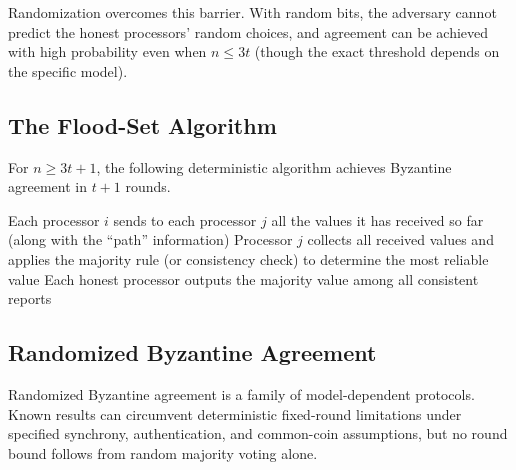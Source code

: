 \documentclass[twoside,12pt]{book}
\theoremstyle{plain}
\theoremstyle{definition}
\theoremstyle{remark}
\begin{document}
Randomization overcomes this barrier. With random bits, the adversary cannot predict the honest processors' random choices, and agreement can be achieved with high probability even when $n \leq 3t$ (though the exact threshold depends on the specific model).

\subsection{The Flood-Set Algorithm}
\label{subsec:flood-set}

For $n \geq 3t + 1$, the following deterministic algorithm achieves Byzantine agreement in $t + 1$ rounds.

\begin{algorithm}[H]
\caption{Flood-Set Algorithm ($\mathrm{OM}(t+1)$)}
\label{alg:flood-set}
\begin{algorithmic}[1]
\State Each processor $i$ sends to each processor $j$ all the values it has received so far (along with the ``path'' information)
\State Processor $j$ collects all received values and applies the majority rule (or consistency check) to determine the most reliable value
\EndFor
\State Each honest processor outputs the majority value among all consistent reports
\EndProcedure
\end{algorithmic}
\end{algorithm}

\subsection{Randomized Byzantine Agreement}
\label{subsec:random-byzantine}

Randomized Byzantine agreement is a family of model-dependent protocols.
Known results can circumvent deterministic fixed-round limitations under
specified synchrony, authentication, and common-coin assumptions, but no
round bound follows from random majority voting alone.
\end{document}
